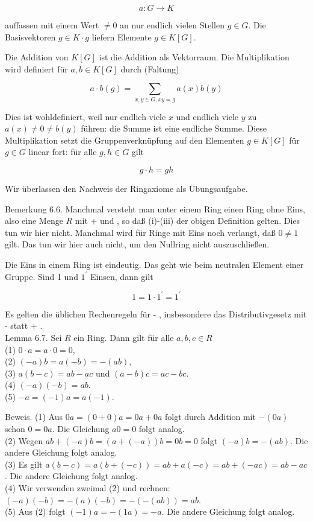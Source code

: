 \documentclass[10pt, letterpaper]{article}
\begin{document}
$$
a: G \rightarrow K
$$

auffassen mit einem Wert $\neq 0$ an nur endlich vielen Stellen $g \in G$. Die Basisvektoren $g \in K \cdot g$ liefern Elemente $g \in K[G]$.

Die Addition von $K[G]$ ist die Addition als Vektorraum. Die Multiplikation wird definiert für $a, b \in K[G]$ durch (Faltung)

$$
a \cdot b(g)=\sum_{x, y \in G, x y=g} a(x) b(y)
$$

Dies ist wohldefiniert, weil nur endlich viele $x$ und endlich viele $y$ zu $a(x) \neq 0 \neq b(y)$ führen: die Summe ist eine endliche Summe. Diese Multiplikation setzt die Gruppenverknüpfung auf den Elementen $g \in K[G]$ für $g \in G$ linear fort: für alle $g, h \in G$ gilt

$$
g \cdot h=g h
$$

Wir überlassen den Nachweis der Ringaxiome als Übungsaufgabe.

Bemerkung 6.6. Manchmal versteht man unter einem Ring einen Ring ohne Eins, also eine Menge $R$ mit + und , so daß (i)-(iii) der obigen Definition gelten. Dies tun wir hier nicht. Manchmal wird für Ringe mit Eins noch verlangt, daß $0 \neq 1$ gilt. Das tun wir hier auch nicht, um den Nullring nicht auszuschließen.

Die Eins in einem Ring ist eindeutig. Das geht wie beim neutralen Element einer Gruppe. Sind 1 und $1^{\prime}$ Einsen, dann gilt

$$
1=1 \cdot 1^{\prime}=1^{\prime}
$$

Es gelten die üblichen Rechenregeln für - , insbesondere das Distributivgesetz mit - statt + .\\
Lemma 6.7. Sei $R$ ein Ring. Dann gilt für alle $a, b, c \in R$\\
(1) $0 \cdot a=a \cdot 0=0$,\\
(2) $(-a) b=a(-b)=-(a b)$,\\
(3) $a(b-c)=a b-a c$ und $(a-b) c=a c-b c$.\\
(4) $(-a)(-b)=a b$.\\
(5) $-a=(-1) a=a(-1)$.

Beweis. (1) Aus $0 a=(0+0) a=0 a+0 a$ folgt durch Addition mit $-(0 a)$ schon $0=0 a$. Die Gleichung $a 0=0$ folgt analog.\\
(2) Wegen $a b+(-a) b=(a+(-a)) b=0 b=0$ folgt $(-a) b=-(a b)$. Die andere Gleichung folgt analog.\\
(3) Es gilt $a(b-c)=a(b+(-c))=a b+a(-c)=a b+(-a c)=a b-a c$. Die andere Gleichung folgt analog.\\
(4) Wir verwenden zweimal (2) und rechnen: $(-a)(-b)=-(a)(-b)=-(-(a b))=a b$.\\
(5) Aus (2) folgt $(-1) a=-(1 a)=-a$. Die andere Gleichung folgt analog.
\end{document}
